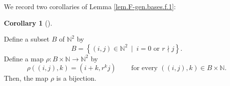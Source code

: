 \documentclass[numbers=enddot,12pt,final,onecolumn,notitlepage]{scrartcl}%
\theoremstyle{definition}
\newtheorem{coro}[theo]{Corollary}
\newenvironment{corollary}[1][]
{\begin{coro}[#1]\begin{leftbar}}
{\end{leftbar}\end{coro}}
\begin{document}
We record two corollaries of Lemma \ref{lem.F-gen.bases.f.1}:

\begin{corollary}
\label{cor.F-gen.bases.f.1.cor1}Define a subset $B$ of $\mathbb{N}^{2}$ by%
\begin{equation}
B=\left\{  \left(  i,j\right)  \in\mathbb{N}^{2}\ \mid\ i=0\text{ or }r\nmid
j\right\}  . \label{eq.cor.F-gen.bases.f.1.cor1.def-B}%
\end{equation}
Define a map $\rho:B\times\mathbb{N}\rightarrow\mathbb{N}^{2}$ by%
\begin{equation}
\rho\left(  \left(  i,j\right)  ,k\right)  =\left(  i+k,r^{k}j\right)
\ \ \ \ \ \ \ \ \ \ \text{for every }\left(  \left(  i,j\right)  ,k\right)
\in B\times\mathbb{N}. \label{eq.cor.F-gen.bases.f.1.cor1.def-rho}%
\end{equation}
Then, the map $\rho$ is a bijection.
\end{corollary}
\end{document}
